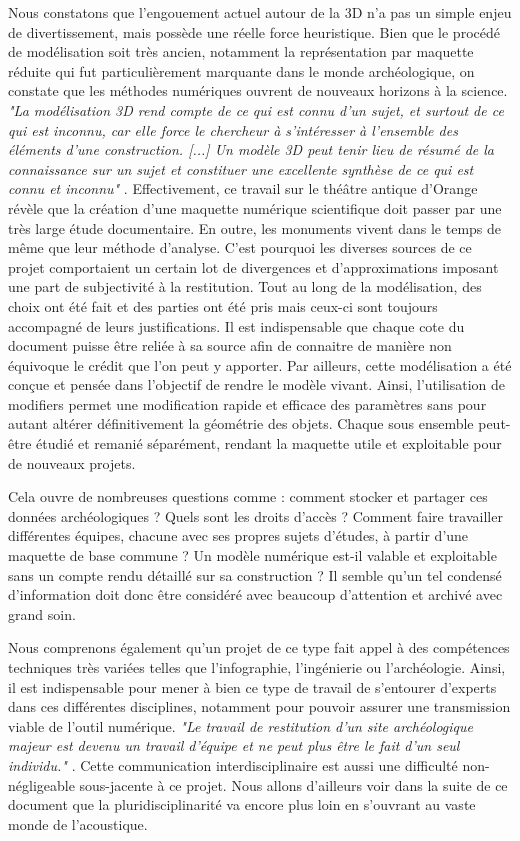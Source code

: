 Nous constatons que l'engouement actuel autour de la 3D n'a pas un simple enjeu de divertissement, mais possède une réelle force heuristique. Bien que le procédé de modélisation soit très ancien, notamment la représentation par maquette réduite qui fut particulièrement marquante dans le monde archéologique, on constate que les méthodes numériques ouvrent de nouveaux horizons à la science. \textit{"La modélisation 3D rend compte de ce qui est connu d’un sujet, et surtout de ce qui est inconnu, car elle force le chercheur à s’intéresser à l’ensemble des éléments d’une construction. [...] Un modèle 3D peut tenir lieu de résumé de la connaissance sur un sujet et constituer une excellente synthèse de ce qui est connu et inconnu"}  \cite{rocheleau}. Effectivement, ce travail sur le théâtre antique d'Orange révèle que la création d'une maquette numérique scientifique doit passer par une très large étude documentaire. En outre, les monuments vivent dans le temps de même que leur méthode d'analyse. C'est pourquoi les diverses sources de ce projet comportaient un certain lot de divergences et d'approximations imposant une part de subjectivité à la restitution. Tout au long de la modélisation, des choix ont été fait et des parties ont été pris mais ceux-ci sont toujours accompagné de leurs justifications. Il est indispensable que chaque cote du document puisse être reliée à sa source afin de connaitre de manière non équivoque le crédit que l'on peut y apporter. 
Par ailleurs, cette modélisation a été conçue et pensée dans l'objectif de rendre le modèle vivant. Ainsi, l'utilisation de \glspl{modifier} permet une modification rapide et efficace des paramètres sans pour autant altérer définitivement la géométrie des objets. Chaque sous ensemble peut-être étudié et remanié séparément, rendant la maquette utile et exploitable pour de nouveaux projets.

Cela ouvre de nombreuses questions comme : comment stocker et partager ces données archéologiques ? Quels sont les droits d'accès ? Comment faire travailler différentes équipes, chacune avec ses propres sujets d'études, à partir d'une maquette de base commune ? Un modèle numérique est-il valable et exploitable sans un compte rendu détaillé sur sa construction ? Il semble qu'un tel condensé d'information doit donc être considéré avec beaucoup d'attention et archivé avec grand soin. 

Nous comprenons également qu'un projet de ce type fait appel à des compétences techniques très variées telles que l'infographie, l'ingénierie ou l'archéologie. Ainsi, il est indispensable pour mener à bien ce type de travail de s'entourer d'experts dans ces différentes disciplines, notamment pour pouvoir assurer une transmission viable de l'outil numérique. \textit{"Le travail de restitution d’un site archéologique majeur est devenu un travail d’équipe et ne peut plus être le fait d’un seul individu."} \cite{archeogrid}. Cette communication interdisciplinaire est aussi une difficulté non-négligeable sous-jacente à ce projet. Nous allons d'ailleurs voir dans la suite de ce document que la pluridisciplinarité va encore plus loin en s'ouvrant au vaste monde de l'acoustique. 
	
